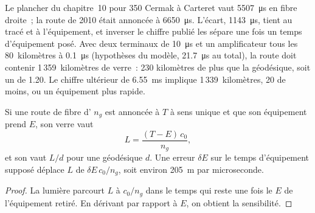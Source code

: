 Le plancher du chapitre~10 pour 350 Cermak à Carteret vaut \qty{5507}{\micro\second} en fibre droite~; la route de 2010 était annoncée à
\qty{6650}{\micro\second}. L'écart, \qty{1143}{\micro\second}, tient au tracé et à l'équipement, et inverser le chiffre publié les sépare
une fois un temps d'équipement posé. Avec deux terminaux de \qty{10}{\micro\second} et un amplificateur tous les 80~kilomètres à
\qty{0.1}{\micro\second} (hypothèses du modèle, \qty{21.7}{\micro\second} au total), la route doit contenir 1\,359~kilomètres de verre~: 230
kilomètres de plus que la géodésique, soit un  de 1.20. Le chiffre ultérieur de \qty{6.55}{\milli\second} implique 1\,339~kilomètres, 20 de moins,
ou un équipement plus rapide.

\begin{proposition}\label{prop:nw:long-haul-fibre:invert}
Si une route de fibre d' $n_g$ est annoncée à $T$ à sens unique et que son équipement prend $E$, son verre vaut
\[
  L = \frac{(T - E)\,c_0}{n_g},
\]
et son  vaut $L/d$ pour une géodésique $d$. Une erreur $\delta E$ sur le temps d'équipement supposé déplace $L$ de $\delta E\,c_0/n_g$, soit environ
\qty{205}{\metre} par microseconde.
\end{proposition}

\begin{proof}
La lumière parcourt $L$ à $c_0/n_g$ dans le temps qui reste une fois le $E$ de l'équipement retiré. En dérivant par rapport à $E$, on obtient la sensibilité.
\end{proof}

\label{lst:nw:long-haul-fibre:components}

